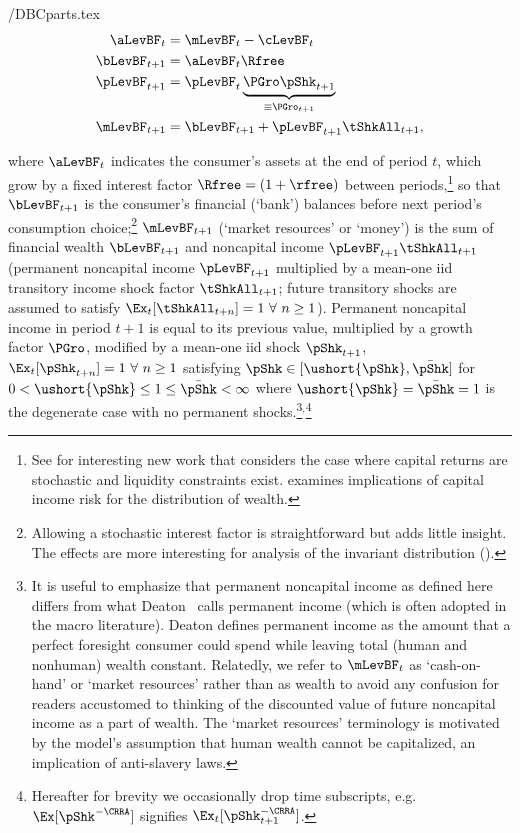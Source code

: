 \documentclass[./BufferStockTheory.tex]{subfiles}
\begin{document}
\begin{verbatimwrite}{\EqDir/DBCparts.tex}
\begin{equation}\begin{gathered}\begin{aligned}
\aLevBF_{t}    & = \mLevBF_{t}-\cLevBF_{t}  \label{eq:DBCparts} \\
\bLevBF_{t+1}    & = \aLevBF_{t} \Rfree \notag \\
\pLevBF_{t+1}  & = \pLevBF_{t} \underbrace{\PGro\pShk_{t+1}}_{\equiv \PGro_{t+1}}  \notag \\
\mLevBF_{t+1}  & =  \bLevBF_{t+1} +\pLevBF_{t+1}\tShkAll_{t+1},  \notag
\end{aligned}\end{gathered}\end{equation}
\end{verbatimwrite}
 where $\aLevBF_{t}$ indicates the consumer's assets at the end of period $t$, which grow by a fixed interest factor $\Rfree =(1+\rfree)$ between periods,\footnote{See \cite{mstCapIncFluct} for interesting new work that considers the case where capital returns are stochastic and liquidity constraints exist.  \cite{benhabibWealth} examines implications of capital income risk for the distribution of wealth.}  so that $\bLevBF_{t+1}$ is the consumer's financial (`bank') balances before next period's consumption choice;\footnote{Allowing a stochastic interest factor is straightforward but adds little insight.  The effects are more interesting for analysis of the invariant distribution (\cite{szeidlInvariant}).} $\mLevBF_{t+1}$ (`market resources' or `money') is the sum of financial wealth $\bLevBF_{t+1}$ and noncapital income $\pLevBF_{t+1}\tShkAll_{t+1}$ (permanent noncapital income $\pLevBF_{t+1}$ multiplied by a mean-one iid transitory income shock factor $\tShkAll_{t+1}$; future transitory shocks are assumed to satisfy $\Ex_{t}[{\tShkAll}_{t+n}]=1~\forall~n\geq 1$). Permanent noncapital income in period $t+1$ is equal to its previous value, multiplied by a growth factor $\PGro$, modified by a mean-one iid shock $\pShk_{t+1}$, $\Ex_{t}[{\pShk}_{t+n}]=1~\forall~n \geq 1$ satisfying $\pShk \in [\ushort{\pShk},\bar{\pShk}]$ for $0 < \ushort{\pShk} \leq 1 \leq \bar{\pShk} < \infty$ where $\ushort{\pShk}=\bar{\pShk}=1$ is the degenerate case with no permanent shocks.\footnote{It is useful to emphasize that permanent noncapital income as defined here differs from what Deaton~\citeyearpar{deatonUnderstandingC} calls permanent income (which is often adopted in the macro literature).  Deaton defines permanent income as the amount that a perfect foresight consumer could spend while leaving total (human and nonhuman) wealth constant.  Relatedly, we refer to $\mLevBF_{t}$ as `cash-on-hand' or `market resources' rather than as wealth to avoid any confusion for readers accustomed to thinking of the discounted value of future noncapital income as a part of wealth.  The `market resources' terminology is motivated by the model's assumption that human wealth cannot be capitalized, an implication of anti-slavery laws.}$^{,}$\footnote{Hereafter for brevity we occasionally drop time subscripts, e.g.\ $\Ex[\pShk^{-\CRRA}]$ signifies $\Ex_{t}[\pShk_{t+1}^{-\CRRA}]$.}
\end{document}
